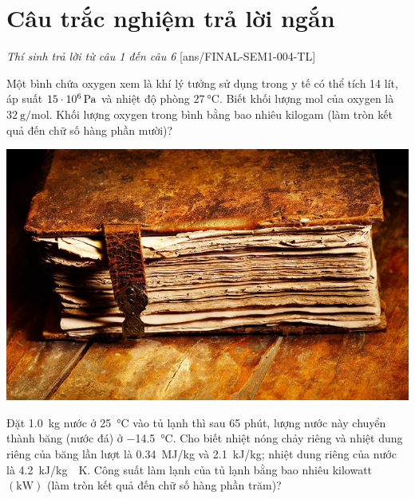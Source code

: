 \section{Câu trắc nghiệm trả lời ngắn} \textit{Thí sinh trả lời từ câu 1 đến câu 6}
\setcounter{ex}{0}
[ans/FINAL-SEM1-004-TL]
\begin{ex}
	Một bình chứa oxygen xem là khí lý tưởng sử dụng trong y tế có thể tích 14 lít, áp suất $\SI{15E6}{\pascal}$ và nhiệt độ phòng $\SI{27}{\celsius}$. Biết khối lượng mol của oxygen là $\SI{32}{\gram/\mole}$. Khối lượng oxygen trong bình bằng bao nhiêu kilogam (làm tròn kết quả đến chữ số hàng phần mười)?
	\shortans[oly]{ }
	\loigiai{
		
	}
\end{ex}
\begin{ex}
	{\includegraphics[scale=0.15]{../figs/FINAL-SEM1-004-10}}
	\shortans[oly]{ }
	\loigiai{
		
	}
\end{ex}
\begin{ex}
Đặt \SI{1.0}{\kilogram} nước ở \SI{25}{\celsius} vào tủ lạnh thì sau 65 phút, lượng nước này chuyển thành băng (nước đá) ở \SI{-14.5}{\celsius}. Cho biết nhiệt nóng chảy riêng và nhiệt dung riêng của băng lần lượt là \SI{0.34}{\mega\joule/\kilogram} và \SI{2.1}{\kilo\joule/\kilogram}; nhiệt dung riêng của nước là \SI{4.2}{\kilo\joule/\kilogram\cdot\kelvin}. Công suất làm lạnh của tủ lạnh bằng bao nhiêu kilowatt $\left(\si{\kilo\watt}\right)$ (làm tròn kết quả đến chữ số hàng phần trăm)?	
	\shortans[oly]{ }
	\loigiai{
		
	}
\end{ex}
